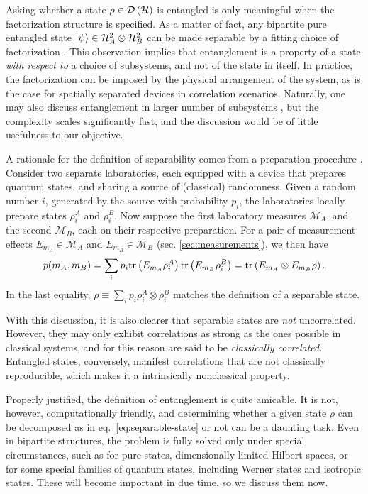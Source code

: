 		Asking whether a state $\rho \in \mathcal{D}\left( \mathcal{H} \right)$ is entangled is only meaningful when the factorization structure is specified. As a matter of fact, any bipartite pure entangled state $\ket{\psi} \in \mathcal{H}^{2}_A \otimes \mathcal{H}^{2}_B$ can be made separable by a fitting choice of factorization \cite{terra_2007_singleparticle}. This observation implies that entanglement is a property of a state \emph{with respect to} a choice of subsystems, and not of the state in itself. In practice, the factorization can be imposed by the physical arrangement of the system, as is the case for spatially separated devices in correlation scenarios. Naturally, one may also discuss entanglement in larger number of subsystems \cite{horodecki_2009_entanglement}, but the complexity scales significantly fast, and the discussion would be of little usefulness to our objective.
	
		A rationale for the definition of separability comes from a preparation procedure \cite{werner_1989}. Consider two separate laboratories, each equipped with a device that prepares quantum states, and sharing a source of (classical) randomness. Given a random number $i$, generated by the source with probability $p_i$, the laboratories locally prepare states $\rho_i^A$ and $\rho_i^B$. Now suppose the first laboratory measures $\mathcal{M}_A$, and the second $\mathcal{M}_B$, each on their respective preparation. For a pair of measurement effects $E_{m_A} \in \mathcal{M}_A$ and $E_{m_B} \in \mathcal{M}_B$ (sec. \ref{sec:measurements}), we then have
		$$
			p(m_A, m_B) = \sum_i p_i \text{tr}\left( E_{m_A} \rho_i^A \right) \text{tr}\left( E_{m_B} \rho_i^B \right) = \text{tr}\left(  E_{m_A} \otimes E_{m_B} \rho \right) .
		$$
		In the last equality, $\rho \equiv \sum_i p_i \rho_i^A \otimes \rho_i^B$ matches the definition of a separable state.
		
		With this discussion, it is also clearer that separable states are \emph{not} uncorrelated. However, they may only exhibit correlations as strong as the ones possible in classical systems, and for this reason are said to be \emph{classically correlated}. Entangled states, conversely, manifest correlations that are not classically reproducible, which makes it a intrinsically nonclassical property.
	
		Properly justified, the definition of entanglement is quite amicable. It is not, however, computationally friendly, and determining whether a given state $\rho$ can be decomposed as in eq.~\eqref{eq:separable-state} or not can be a daunting task. Even in bipartite structures, the problem is fully solved only under special circumstances, such as for pure states, dimensionally limited Hilbert spaces, or for some special families of quantum states, including Werner states and isotropic states. These will become important in due time, so we discuss them now.
	
